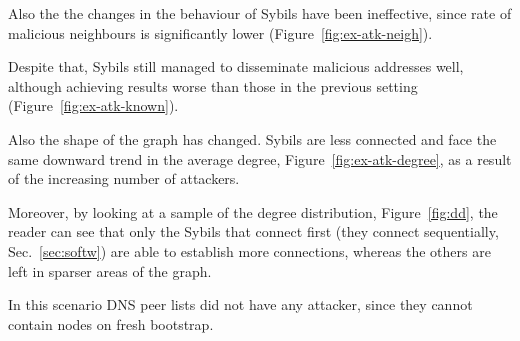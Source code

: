 Also the the changes in the behaviour of Sybils have been ineffective, since rate of malicious neighbours is significantly lower (Figure~\ref{fig:ex-atk-neigh}).\par

Despite that, Sybils still managed to disseminate malicious addresses well, although achieving results worse than those in the previous setting (Figure~\ref{fig:ex-atk-known}).\par

Also the shape of the graph has changed. Sybils are less connected and face the same downward trend in the average degree, Figure~\ref{fig:ex-atk-degree}, as a result of the increasing number of attackers.

Moreover, by looking at a sample of the degree distribution, Figure~\ref{fig:dd}, the reader can see that only the Sybils that connect first (they connect sequentially, Sec.~\ref{sec:softw}) are able to establish more connections, whereas the others are left in sparser areas of the graph.\par

In this scenario DNS peer lists did not have any attacker, since they cannot contain nodes on fresh bootstrap.